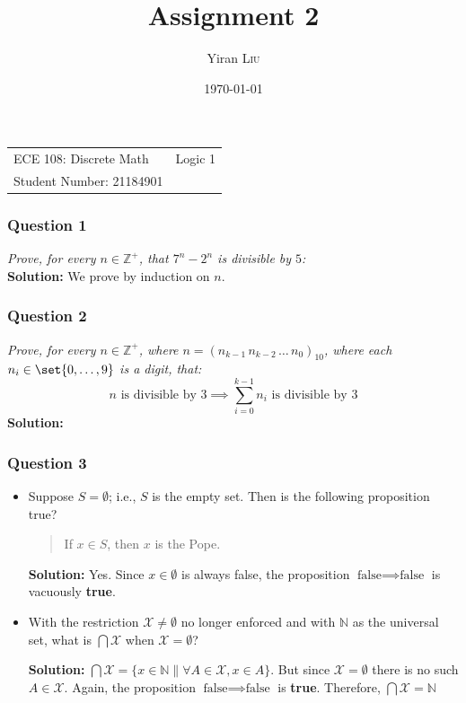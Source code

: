 \documentclass[
	letterpaper, %
	11pt, %
]{CSUniSchoolLabReport}
\title{Assignment 2} %
\author{Yiran \textsc{Liu}} %
\date{\today} %
\begin{document}
\maketitle %

\begin{center}
	\begin{tabular}{l r}
      ECE 108: Discrete Math & Logic 1 \\
      Student Number: 21184901
	\end{tabular}
\end{center}

\subsubsection*{Question 1}
\textit{Prove, for every $n\in\mathbb{Z}^+$, that $7^n - 2^n$ is divisible by $5$:} \\

\textbf{Solution:} We prove by induction on $n$. 

\subsubsection*{Question 2}
\textit{Prove, for every $n\in\mathbb{Z}^+$, where $n = \left(n_{k-1}\,n_{k-2}\,\ldots\,n_0\right)_{10}$, where each $n_i \in\set{0,\ldots, 9}$ is a digit, that:}
\[
n\text{ is divisible by } 3 \implies \sum_{i=0}^{k-1} n_i \text{ is divisible by } 3
\]
\textbf{Solution:} 

\subsubsection*{Question 3}
\begin{itemize}
	\item Suppose $S = \emptyset$; i.e., $S$ is the empty set. Then is the following proposition true? \begin{quote}If $x\in S$, then $x$ is the Pope.\end{quote}
	\textbf{Solution: } Yes. Since $x \in \emptyset$ is always false, the proposition $\text{false} \implies \text{false}$ is vacuously \textbf{true}. 
	\item With the restriction $\mathcal{X} \not= \emptyset$ no longer enforced and with $\mathbb{N}$ as the universal set, what is $\bigcap \mathcal{X}$ when $\mathcal{X} = \emptyset$?

	\textbf{Solution: } $\bigcap \mathcal{X} = \{x \in \mathbb{N} \| \forall A \in \mathcal{X}, x \in A\}$. But since $\mathcal{X} = \emptyset$ there is no such $A \in \mathcal{X}$. Again, the proposition $\text{false} \implies \text{false}$ is \textbf{true}. Therefore, $\bigcap \mathcal{X} = \mathbb{N}$
\end{itemize}
\end{document}
